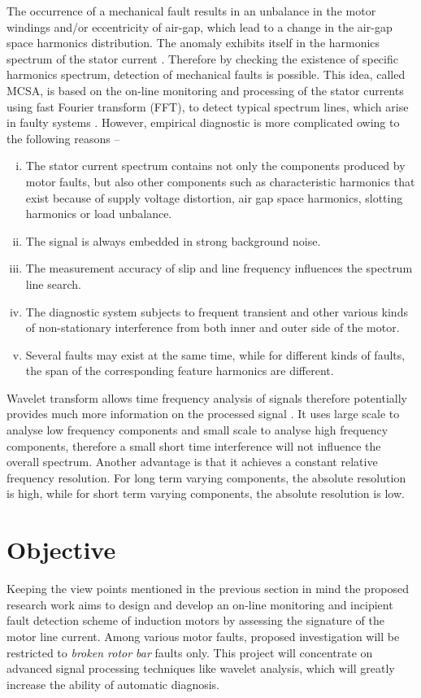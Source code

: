 \documentclass[a4paper,11pt]{report}
\begin{document}
The occurrence of a mechanical fault results in an unbalance in the motor windings and/or eccentricity of air-gap, which lead to a change in the air-gap space harmonics distribution. The anomaly exhibits itself in the harmonics spectrum of the stator current \cite{00897122-1}. Therefore by checking the existence of specific harmonics spectrum, detection of mechanical faults is possible. This idea, called MCSA, is based on the on-line monitoring and processing of the stator currents using fast Fourier transform (FFT), to detect typical spectrum lines, which arise in faulty systems \cite{00897122-6}. However, empirical diagnostic is more complicated owing to the following reasons --

\begin{enumerate}[(i)]
\item The stator current spectrum contains not only the components produced by motor faults, but also other components such as characteristic harmonics that exist because of supply voltage distortion, air gap space harmonics, slotting harmonics or load unbalance. 
\item The signal is always embedded in strong background noise. 
\item The measurement accuracy of slip and line frequency influences the spectrum line search. 
\item The diagnostic system subjects to frequent transient and other various kinds of non-stationary interference from both inner and outer side of the motor. 
\item Several faults may exist at the same time, while for different kinds of faults, the span of the corresponding feature harmonics are different.
\end{enumerate}

Wavelet transform allows time frequency analysis of signals therefore potentially provides much more information on the processed signal \cite{pswbook}. It uses large scale to analyse low frequency components and small scale to analyse high frequency components, therefore a small short time interference will not influence the overall spectrum. Another advantage is that it achieves a constant relative frequency resolution. For long term varying components, the absolute resolution is high, while for short term varying components, the absolute resolution is low.

\section{Objective} \label{obj}
Keeping the view points mentioned in the previous section in mind the proposed research work aims to design and develop an on-line monitoring and incipient fault detection scheme of induction motors by assessing the signature of the motor line current. Among various motor faults, proposed investigation will be restricted to \emph{broken rotor bar} faults only. This project will concentrate on advanced signal processing techniques like wavelet analysis, which will greatly increase the ability of automatic diagnosis.
\end{document}
